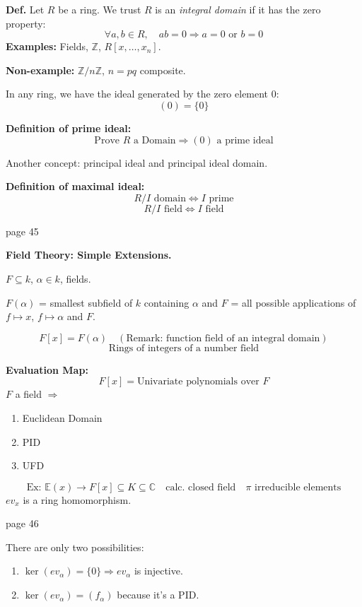 \documentclass{article}
\begin{document}
\textbf{Def.} Let $R$ be a ring. We trust $R$ is an \textit{integral domain} if it has the zero property:
\[
\forall a, b \in R, \quad ab = 0 \Rightarrow a = 0 \text{ or } b = 0
\]
\textbf{Examples:} Fields, $\mathbb{Z}$, $R[x, \ldots, x_n]$.

\textbf{Non-example:} $\mathbb{Z}/n\mathbb{Z}$, $n = pq$ composite.

In any ring, we have the ideal generated by the zero element $0$:
\[
(0) = \{0\}
\]

\textbf{Definition of prime ideal:}
\[
\text{Prove } R \text{ a Domain} \Rightarrow (0) \text{ a prime ideal}
\]

Another concept: principal ideal and principal ideal domain.

\textbf{Definition of maximal ideal:}
\[
R/I \text{ domain} \Leftrightarrow I \text{ prime}
\]
\[
R/I \text{ field} \Leftrightarrow I \text{ field}
\]

\newpage
\noindent page 45

\textbf{Field Theory: Simple Extensions.}

$F \subseteq k$, $\alpha \in k$, fields.

$F(\alpha)$ = smallest subfield of $k$ containing $\alpha$ and $F$ = all possible applications of $f \mapsto x$, $f \mapsto \alpha$ and $F$.

\[
F[x] = F(\alpha) \quad (\text{Remark: function field of an integral domain})
\]
\[
\text{Rings of integers of a number field}
\]

\textbf{Evaluation Map:}
\[
F[x] = \text{Univariate polynomials over } F
\]
$F$ a field $\Rightarrow$
\begin{enumerate}
    \item Euclidean Domain
    \item PID
    \item UFD
\end{enumerate}

\[
\text{Ex: } \mathbb{E}(x) \to F[x] \subseteq K \subseteq \mathbb{C} \quad \text{calc. closed field} \quad \pi \text{ irreducible elements}
\]
$ev_x$ is a ring homomorphism.

\newpage
\noindent page 46

There are only two possibilities:
\begin{enumerate}
    \item $\ker(ev_\alpha) = \{0\} \Rightarrow ev_\alpha$ is injective.
    \item $\ker(ev_\alpha) = (f_\alpha)$ because it's a PID.
\end{enumerate}
\end{document}
